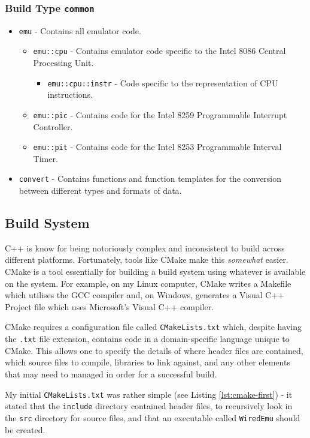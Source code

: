 	\subsubsection{Build Type \texttt{common}}
		\begin{itemize}
			\item \texttt{emu} - Contains all emulator code.
			\begin{itemize}
				\item \texttt{emu::cpu} - Contains emulator code specific to the Intel 8086 Central Processing Unit.
				\begin{itemize}
					\item \texttt{emu::cpu::instr} - Code specific to the representation of CPU instructions.
				\end{itemize}
				\item \texttt{emu::pic} - Contains code for the Intel 8259 Programmable Interrupt Controller.
				\item \texttt{emu::pit} - Contains code for the Intel 8253 Programmable Interval Timer.
			\end{itemize}
			\item \texttt{convert} - Contains functions and function templates for the conversion between different types and formats of data.
		\end{itemize}


\subsection{Build System}
	C++ is know for being notoriously complex and inconsistent to build across different platforms. Fortunately, tools like CMake make this \textit{somewhat} easier. CMake is a tool essentially for building a build system using whatever is available on the system. For example, on my Linux computer, CMake writes a Makefile which utilises the GCC compiler and, on Windows, generates a Visual C++ Project file which uses Microsoft's Visual C++ compiler.

	CMake requires a configuration file called \texttt{CMakeLists.txt} which, despite having the \texttt{.txt} file extension, contains code in a domain-specific language unique to CMake. This allows one to specify the details of where header files are contained, which source files to compile, libraries to link against, and any other elements that may need to managed in order for a successful build.

	My initial \texttt{CMakeLists.txt} was rather simple (see Listing \ref{lst:cmake-first}) - it stated that the \texttt{include} directory contained header files, to recursively look in the \texttt{src} directory for source files, and that an executable called \texttt{WiredEmu} should be created.

